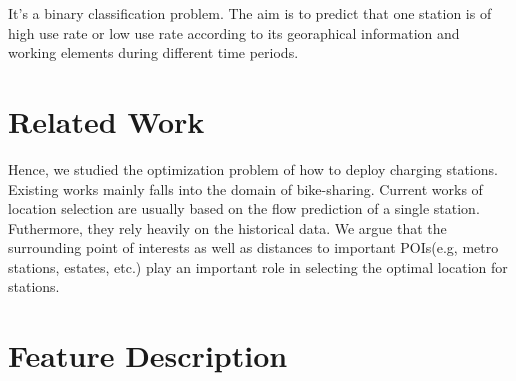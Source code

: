 \documentclass[conference]{IEEEtran}
\begin{document}
It's a binary classification problem. The aim is to predict that one station is of high use rate or low use rate according to its georaphical information and working elements during different time periods.

\section{Related Work}
Hence, we studied the optimization problem of how to deploy charging stations. Existing works \cite{b1} mainly falls into the domain of bike-sharing. Current works of location selection are usually based on the flow prediction of a single station. Futhermore, they rely heavily on the historical data. We argue that the surrounding point of interests as well as distances to important POIs(e.g, metro stations, estates, etc.) play an important role in selecting the optimal location for stations.

\section{Feature Description}
\end{document}
